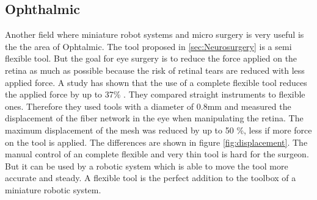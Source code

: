 \subsection{Ophthalmic}
\label{sec:eyesurgery}
Another field where miniature robot systems and micro surgery is very useful is the the area of Ophtalmic. The tool proposed in \ref{sec:Neurosurgery} is a semi flexible tool. But the goal for eye surgery is to reduce the force applied on the retina as much as possible because the risk of retinal tears are reduced with less applied force. A study has shown that the use of a complete flexible tool reduces the applied force by up to 37\% \cite{flexibleRetina}. They compared straight instruments to flexible ones. Therefore they used tools with a diameter of 0.8mm and measured the displacement of the fiber network in the eye when manipulating the retina. The maximum displacement of the mesh was reduced by up to 50 \%, less if more force on the tool is applied. The differences are shown in figure \ref{fig:displacement}. The manual control of an complete flexible and very thin tool is hard for the surgeon. But it can be used by a robotic system which is able to move the tool more accurate and steady. A flexible tool is the perfect addition to the toolbox of a miniature robotic system.
